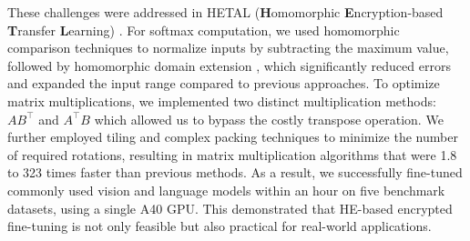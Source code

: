 \documentclass[letterpaper, 10pt]{article}
\begin{document}
These challenges were addressed in HETAL (\textbf{H}omomorphic \textbf{E}ncryption-based \textbf{T}ransfer \textbf{L}earning) \cite{lee2023hetal}. 
For softmax computation, we used homomorphic comparison techniques \cite{cheon2020efficient} to normalize inputs by subtracting the maximum value, followed by homomorphic domain extension \cite{cheon2022efficient}, which significantly reduced errors and expanded the input range compared to previous approaches.
To optimize matrix multiplications, we implemented two distinct multiplication methods: $AB^\intercal$ and $A^\intercal B$ which allowed us to bypass the costly transpose operation.
We further employed tiling and complex packing techniques to minimize the number of required rotations, resulting in matrix multiplication algorithms that were 1.8 to 323 times faster than previous methods.
As a result, we successfully fine-tuned commonly used vision and language models within an hour on five benchmark datasets, using a single A40 GPU. 
This demonstrated that HE-based encrypted fine-tuning is not only feasible but also practical for real-world applications.




{
\scriptsize
}
\end{document}
